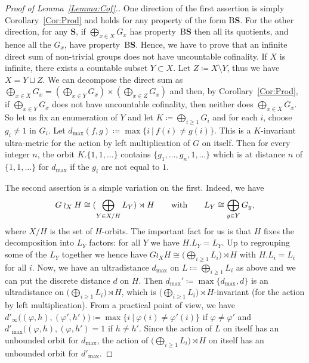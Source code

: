 \documentclass[a4paper]{article}
\newcounter{mycomment}
\newcommand{\mycomment}[2][]{\refstepcounter{mycomment}{\todo[color={green!33},size=\small]{\textbf{Commentaire [\uppercase{#1}\themycomment]:}~#2}}}
\newcommand{\PH}[1]{\todo[color={blue!33},size=small]{\textbf{PH :} #1}}
\newcommand{\GS}[1]{\mycomment[GS]{#1}}
\theoremstyle{definition}
\newcommand*{\category}[1]{\textbf{#1}}
\newcommand*{\CatS}{\category{S}}
\newcommand*{\BS}{B\textbf{S}}
\newcommand{\setst}[2]{\{#1\ |\ #2\}}
\begin{document}
\begin{proof}[Proof of Lemma~\ref{Lemma:Cof}.]
One direction of the first assertion is simply Corollary~\ref{Cor:Prod} and holds for any property of the form \BS.
For the other direction, for any \CatS, if $\bigoplus_{x\in X}G_x$ has property~\BS{} then all its quotients, and hence all the $G_x$, have property~\BS.
Hence, we have to prove that an infinite direct sum of non-trivial groups does not have uncountable cofinality.
If $X$ is infinite, there exists a countable subset $Y \subset X$. Let $Z \coloneqq X\setminus Y$, thus we have $X = Y \sqcup Z$. We can decompose the direct sum as $\bigoplus_{x\in X}G_x = (\bigoplus_{x\in Y}G_x) \times (\bigoplus_{x\in Z}G_x)$ and then, by Corollary~\ref{Cor:Prod}, if $\bigoplus_{x\in Y}G_x$ does not have uncountable cofinality, then neither does $\bigoplus_{x\in X}G_x$.
So let us fix an enumeration of $Y$ and let $K\coloneqq \bigoplus_{i\geq 1}G_i$ and for each $i$, choose $g_i\neq 1$ in $G_i$.
Let $d_{\max}(f,g)\coloneqq\max\setst{i}{f(i)\neq g(i)}$. %
This is a $K$-invariant ultra-metric for the action by left multiplication of $G$ on itself.
Then for every integer $n$, the orbit $K.\{1,1,\dots\}$ contains $\{g_1,\dots,g_n,1,\dots\}$ which is at distance $n$ of $\{1,1,\dots\}$ for $d_{\max}$ if the $g_i$ are not equal to $1$.

The second assertion is a simple variation on the first.
Indeed, we have
\[
	G\wr_XH\cong(\bigoplus_{Y\in X/H}L_Y)\rtimes H\qquad\textnormal{with}\qquad L_Y\cong\bigoplus_{y\in Y}G_y,
\]
where $X/H$ is the set of $H$-orbits.
The important fact for us is that $H$ fixes the decomposition into $L_Y$ factors: for all $Y$ we have $H.L_Y=L_Y$.
Up to regrouping some of the $L_Y$ together we hence have $G\wr_XH\cong\bigl(\bigoplus_{i\geq 1}L_i\bigr)\rtimes H$ with $H.L_i=L_i$ for all $i$.
Now, we have an ultradistance $d_{\max}$ on $L\coloneqq\bigoplus_{i\geq 1}L_i$ as above and we can put the discrete distance $d$ on $H$.
Then $d_{\max}'\coloneqq\max\{d_{\max},d\}$ is an ultradistance on $\bigl(\bigoplus_{i\geq 1}L_i\bigr)\rtimes H$, which is $\bigl(\bigoplus_{i\geq 1}L_i\bigr)\rtimes H$-invariant (for the action by left multiplication).
From a practical point of view, we have $d'_\infty\bigl((\varphi,h),(\varphi',h')\bigr)\coloneqq\max\setst{i}{\varphi(i)\neq \varphi'(i)}$ if $\varphi\neq \varphi'$ and $d'_{\max}\bigl((\varphi,h),(\varphi,h')=1$ if $h\neq h'$.
Since the action of $L$ on itself has an unbounded orbit for $d_{\max}$, the action of $\bigl(\bigoplus_{i\geq 1}L_i\bigr)\rtimes H$ on itself has an unbounded orbit for $d'_{\max}$.
\end{proof}
\end{document}
